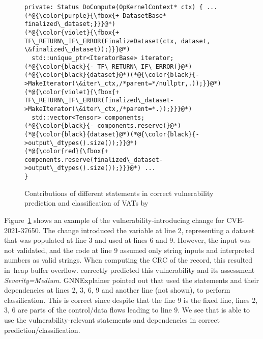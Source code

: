 \begin{figure}[t]
\centering
{}
	\begin{lstlisting}[]
private: Status DoCompute(OpKernelContext* ctx) { ...
(*@{\color{purple}{\fbox{+ DatasetBase* finalized\_dataset;}}}@*)
(*@{\color{violet}{\fbox{+ TF\_RETURN\_IF\_ERROR(FinalizeDataset(ctx, dataset, \&finalized\_dataset));}}}@*)
  std::unique_ptr<IteratorBase> iterator;
(*@{\color{black}{- TF\_RETURN\_IF\_ERROR(}@*)(*@{\color{black}{dataset}@*)(*@{\color{black}{->MakeIterator(\&iter\_ctx,/*parent=*/nullptr,.));}}@*)
(*@{\color{violet}{\fbox{+ TF\_RETURN\_IF\_ERROR(finalized\_dataset->MakeIterator(\&iter\_ctx,/*parent=*.));}}}@*)
  std::vector<Tensor> components;
(*@{\color{black}{- components.reserve(}@*)(*@{\color{black}{dataset}@*)(*@{\color{black}{->output\_dtypes().size());}}@*)
(*@{\color{red}{\fbox{+ components.reserve(finalized\_dataset->output\_dtypes().size());}}}@*) ...
}
\end{lstlisting}
\vspace{-15pt}
\caption{Contributions of different statements in correct
vulnerability prediction and classification of VATs by {\tool}}
\vspace{-6pt}
\label{gnn-example}
\end{figure}





 Figure~\ref{gnn-example} shows an example of
the vulnerability-introduc\-ing change for CVE-2021-37650. The change
introduced the variable  at line 2,
representing a dataset that was populated at line 3 and used at lines
6 and 9. However, the input was not validated, and the code at line 9
assumed only string inputs and interpreted numbers as valid strings.
When computing the CRC of the record, this resulted in~heap buffer
overflow. {\tool} correctly predicted this vulnerability and its
assessment {\em Severity=Medium}. GNNExplainer pointed out that
{\tool} used the statements and their dependencies at lines 2, 3, 6, 9
and another line (not shown), to perform classification. This is
correct since despite that the line 9 is the fixed line, lines 2, 3, 6
are parts of the control/data flows leading to line 9. We see that
{\tool} is able to use the vulnerability-relevant statements and
dependencies in correct prediction/classification.

